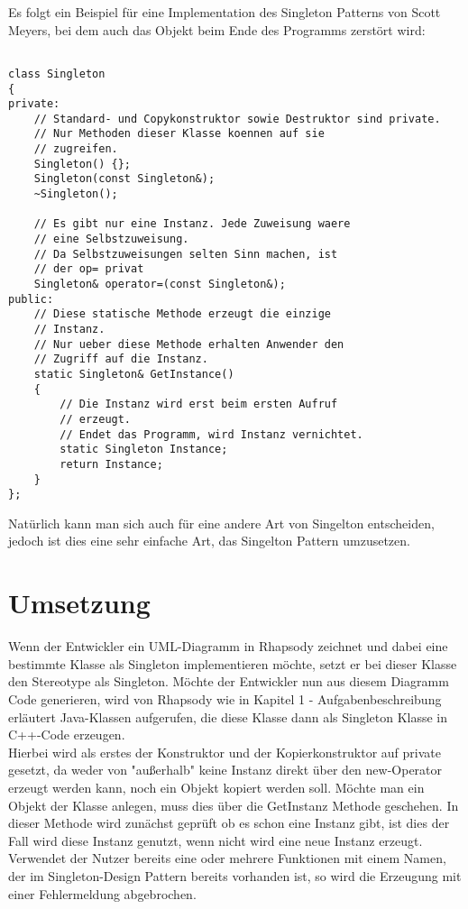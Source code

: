 Es folgt ein Beispiel für eine Implementation des Singleton Patterns von Scott Meyers, bei dem auch das Objekt beim Ende des Programms zerstört wird:
\begin{lstlisting}

class Singleton
{
private:
    // Standard- und Copykonstruktor sowie Destruktor sind private. 
    // Nur Methoden dieser Klasse koennen auf sie 
    // zugreifen.
    Singleton() {};
    Singleton(const Singleton&);
    ~Singleton();

    // Es gibt nur eine Instanz. Jede Zuweisung waere
    // eine Selbstzuweisung.
    // Da Selbstzuweisungen selten Sinn machen, ist
    // der op= privat
    Singleton& operator=(const Singleton&);
public:
    // Diese statische Methode erzeugt die einzige
    // Instanz.
    // Nur ueber diese Methode erhalten Anwender den 
    // Zugriff auf die Instanz.
    static Singleton& GetInstance() 
    {
        // Die Instanz wird erst beim ersten Aufruf
        // erzeugt.
        // Endet das Programm, wird Instanz vernichtet.
        static Singleton Instance;
        return Instance;
    }
};
\end{lstlisting}

Natürlich kann man sich auch für eine andere Art von Singelton entscheiden, jedoch ist dies eine sehr einfache Art, das Singelton Pattern umzusetzen.
\cite{singelton}\cite{singelton2}
\section{Umsetzung}

Wenn der Entwickler ein UML-Diagramm in Rhapsody zeichnet und dabei eine bestimmte Klasse als Singleton implementieren möchte, setzt er bei dieser Klasse den Stereotype als Singleton. Möchte der Entwickler nun aus diesem Diagramm Code generieren, wird von Rhapsody wie in Kapitel 1 - Aufgabenbeschreibung erläutert Java-Klassen aufgerufen, die diese Klasse dann als Singleton Klasse in C++-Code erzeugen. 
\\
Hierbei wird als erstes der Konstruktor und der Kopierkonstruktor auf private gesetzt, da weder von "außerhalb" keine Instanz direkt über den new-Operator erzeugt werden kann, noch ein Objekt kopiert werden soll. Möchte man ein Objekt der Klasse anlegen, muss dies über die GetInstanz Methode geschehen. In dieser Methode wird zunächst geprüft ob es schon eine Instanz gibt, ist dies der Fall wird diese Instanz genutzt, wenn nicht wird eine neue Instanz erzeugt.\\

Verwendet der Nutzer bereits eine oder mehrere Funktionen mit einem Namen, der im Singleton-Design Pattern bereits vorhanden ist, so wird die Erzeugung mit einer Fehlermeldung abgebrochen.


